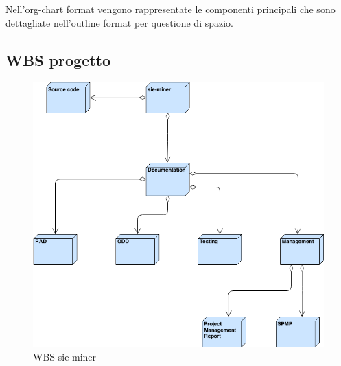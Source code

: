 Nell'org-chart format vengono rappresentate le componenti principali che sono dettagliate nell'outline format per questione di spazio.
\subsection{WBS progetto}
\begin{figure}[ht]
\centering
\includegraphics[width=\textwidth]{img/WBS_master.png}
\caption{WBS sie-miner} 
\end{figure}
\clearpage


